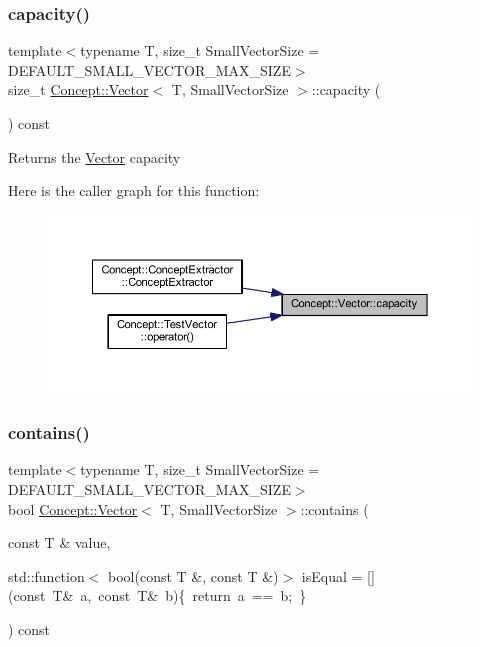 \subsubsection{\texorpdfstring{capacity()}{capacity()}}
{\footnotesize\ttfamily template$<$typename T, size\+\_\+t Small\+Vector\+Size = D\+E\+F\+A\+U\+L\+T\+\_\+\+S\+M\+A\+L\+L\+\_\+\+V\+E\+C\+T\+O\+R\+\_\+\+M\+A\+X\+\_\+\+S\+I\+ZE$>$ \\
size\+\_\+t \mbox{\hyperlink{class_concept_1_1_vector}{Concept\+::\+Vector}}$<$ T, Small\+Vector\+Size $>$\+::capacity (\begin{DoxyParamCaption}{ }\end{DoxyParamCaption}) const\hspace{0.3cm}{\ttfamily [inline]}}

\begin{DoxyReturn}{Returns}
the \mbox{\hyperlink{class_concept_1_1_vector}{Vector}} capacity 
\end{DoxyReturn}
Here is the caller graph for this function\+:\nopagebreak
\begin{figure}[H]
\begin{center}
\leavevmode
\includegraphics[width=350pt]{class_concept_1_1_vector_a7c6ea6d0b7df98242f2247c8d5184c5f_icgraph}
\end{center}
\end{figure}
\mbox{\label{class_concept_1_1_vector_a17d62b0ccb0f1cceb78748c44f625269}} 
\subsubsection{\texorpdfstring{contains()}{contains()}}
{\footnotesize\ttfamily template$<$typename T, size\+\_\+t Small\+Vector\+Size = D\+E\+F\+A\+U\+L\+T\+\_\+\+S\+M\+A\+L\+L\+\_\+\+V\+E\+C\+T\+O\+R\+\_\+\+M\+A\+X\+\_\+\+S\+I\+ZE$>$ \\
bool \mbox{\hyperlink{class_concept_1_1_vector}{Concept\+::\+Vector}}$<$ T, Small\+Vector\+Size $>$\+::contains (\begin{DoxyParamCaption}\item[{const T \&}]{value,  }\item[{std\+::function$<$ bool(const T \&, const T \&)$>$}]{is\+Equal = {\ttfamily \mbox{[}\mbox{]}(const~T\&~a,~const~T\&~b)\{~return~a~==~b;~\}} }\end{DoxyParamCaption}) const\hspace{0.3cm}{\ttfamily [inline]}}

